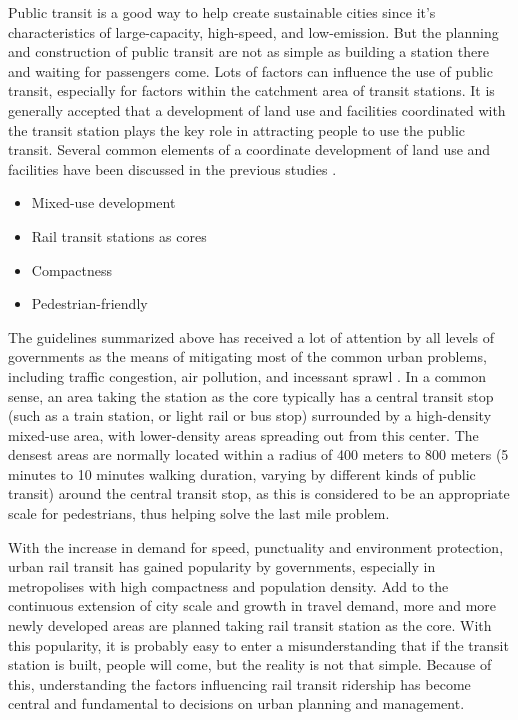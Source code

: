 % 
Public transit is a good way to help create sustainable cities since it's characteristics of large-capacity, high-speed, and low-emission. But the planning and construction of public transit are not as simple as building a station there and waiting for passengers come. Lots of factors can influence the use of public transit, especially for factors within the catchment area of transit stations. It is generally accepted that a development of land use and facilities coordinated with the transit station plays the key role in attracting people to use the public transit. Several common elements of a coordinate development of land use and facilities have been discussed in the previous studies \cite{boarnet1997story,bernick1997transit,megally2001california,cervero2004transit}.

\begin{itemize}
	\setlength{\parskip}{0\baselineskip} %
	\item Mixed-use development
	\item Rail transit stations as cores
	\item Compactness
	\item Pedestrian-friendly
	\setlength{\parskip}{0.7\baselineskip} %
\end{itemize}

The guidelines summarized above has received a lot of attention by all levels of governments as the means of mitigating most of the common urban problems, including traffic congestion, air pollution, and incessant sprawl \cite{cervero2002transit}. In a common sense, an area taking the station as the core typically has a central transit stop (such as a train station, or light rail or bus stop) surrounded by a high-density mixed-use area, with lower-density areas spreading out from this center. The densest areas are normally located within a radius of 400 meters to 800 meters (5 minutes to 10 minutes walking duration, varying by different kinds of public transit) around the central transit stop, as this is considered to be an appropriate scale for pedestrians, thus helping solve the last mile problem. 

With the increase in demand for speed, punctuality and environment protection, urban rail transit has gained popularity by governments, especially in metropolises with high compactness and population density. Add to the continuous extension of city scale and growth in travel demand, more and more newly developed areas are planned taking rail transit station as the core. With this popularity, it is probably easy to enter a misunderstanding that if the transit station is built, people will come, but the reality is not that simple. Because of this, understanding the factors influencing rail transit ridership has become central and fundamental to decisions on urban planning and management. 

